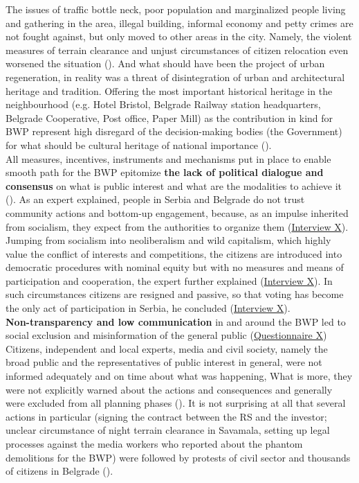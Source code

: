 \documentclass[11pt]{report}
\begin{document}
The issues of traffic bottle neck, poor population and marginalized people living and gathering in the area, illegal building, informal economy and petty crimes are not fought against, but only moved to other areas in the city.
Namely, the violent measures of terrain clearance and unjust circumstances of citizen relocation even worsened the situation (\cite{media}).
And what should have been the project of urban regeneration, in reality was a threat of disintegration of urban and architectural heritage and tradition.
Offering the most important historical heritage in the neighbourhood (e.g. Hotel Bristol, Belgrade Railway station headquarters, Belgrade Cooperative, Post office, Paper Mill) as the contribution in kind for BWP represent high disregard of the decision-making bodies (the Government) for what should be cultural heritage of national importance (\cite{JVA2015}).
\\

All measures, incentives, instruments and mechanisms put in place to enable smooth path for the BWP epitomize \textbf{the lack of political dialogue and consensus} on what is public interest and what are the modalities to achieve it
(\href{Vujosevic}{\cite{vujosevic_post-socialist_2010}}).
As an expert explained, people in Serbia and Belgrade do not trust community actions and bottom-up engagement, because, as an impulse inherited from socialism, they expect from the authorities to organize them
(\href{InterviewX}{Interview X}).
Jumping from socialism into neoliberalism and wild capitalism, which highly value the conflict of interests and competitions, the citizens are introduced into democratic procedures with nominal equity but with no measures and means of participation and cooperation, the expert further explained (\href{InterviewX}{Interview X}).
In such circumstances citizens are resigned and passive, so that voting has become the only act of participation in Serbia, he concluded (\href{InterviewX}{Interview X}).
\\

\textbf{Non-transparency and low communication} in and around the BWP led to social exclusion and misinformation of the general public
(\href{Questionnaire Experts Savamala}{Questionnaire X})
Citizens, independent and local experts, media and civil society, namely the broad public and the representatives of public interest in general, were not informed adequately and on time about what was happening,
What is more, they were not explicitly warned about the actions and consequences and generally were excluded from all planning phases
(\citealt{ministarstvo_prostora_urbani_2014}). 
It is not surprising at all that several actions in particular (signing the contract between the RS and the investor; unclear circumstance of night terrain clearance in Savamala, setting up legal processes against the media workers who reported about the phantom demolitions for the BWP) were followed by protests of civil sector and thousands of citizens in Belgrade (\cite{media, fb}).
\\
\end{document}
